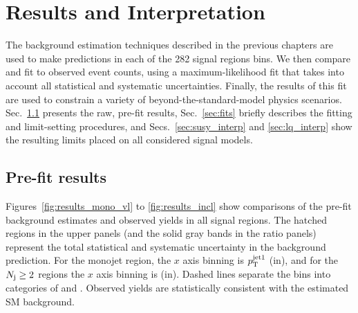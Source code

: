 \chapter{Results and Interpretation}
\label{chap:results}

The background estimation techniques described in the previous chapters are used to make predictions
in each of the 282 signal regions bins. We then compare and fit to observed event counts, using a
maximum-likelihood fit that takes into account all statistical and systematic uncertainties.
Finally, the results of this fit are used to constrain a variety of beyond-the-standard-model physics
scenarios. Sec.~\ref{sec:prefit} presents the raw, pre-fit results, Sec.~\ref{sec:fits} briefly describes
the fitting and limit-setting procedures, and Secs.~\ref{sec:susy_interp} and \ref{sec:lq_interp} show 
the resulting limits placed on all considered signal models.

\section{Pre-fit results}
\label{sec:prefit}

Figures~\ref{fig:results_mono_vl} to \ref{fig:results_incl} show comparisons of the pre-fit background estimates
and observed yields in all signal regions. The hatched regions in the upper panels (and the solid gray bands
in the ratio panels) represent the total statistical and systematic uncertainty in the background prediction.
For the monojet region, the $x$ axis binning is $p_{\mathrm{T}}^{\mathrm{jet1}}$ (in\GeV), and for the $N_{\mathrm{j}}\geq2$ regions
the $x$ axis binning is \mttwo (in\GeV). Dashed lines separate the bins into categories of \Nj and \Nb.
Observed yields are statistically consistent with the estimated SM background.

